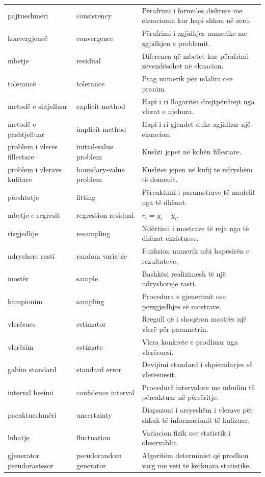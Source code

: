 \documentclass[11pt,oneside,openany]{book}
\begin{document}
\begin{longtable}{p{}p{}p{}}
pajtueshmëri & consistency & Përafrimi i formulës diskrete me ekuacionin kur hapi shkon në zero.\\
konvergjencë & convergence & Përafrimi i zgjidhjes numerike me zgjidhjen e problemit.\\
mbetje & residual & Diferenca që mbetet kur përafrimi zëvendësohet në ekuacion.\\
tolerancë & tolerance & Prag numerik për ndalim ose pranim.\\
metodë e shtjelluar & explicit method & Hapi i ri llogaritet drejtpërdrejt nga vlerat e njohura.\\
metodë e pashtjelluar & implicit method & Hapi i ri gjendet duke zgjidhur një ekuacion.\\
problem i vlerës fillestare & initial-value problem & Kushti jepet në kohën fillestare.\\
problem i vlerave kufitare & boundary-value problem & Kushtet jepen në kufij të ndryshëm të domenit.\\
përshtatje & fitting & Përcaktimi i parametrave të modelit nga të dhënat.\\
mbetje e regresit & regression residual & $r_i=y_i-\hat y_i$.\\
rizgjedhje & resampling & Ndërtimi i mostrave të reja nga të dhënat ekzistuese.\\
ndryshore rasti & random variable & Funksion numerik mbi hapësirën e rezultateve.\\
mostër & sample & Bashkësi realizimesh të një ndryshoreje rasti.\\
kampionim & sampling & Procedura e gjenerimit ose përzgjedhjes së mostrave.\\
vlerësues & estimator & Rregull që i shoqëron mostrës një vlerë për parametrin.\\
vlerësim & estimate & Vlera konkrete e prodhuar nga vlerësuesi.\\
gabim standard & standard error & Devijimi standard i shpërndarjes së vlerësuesit.\\
interval besimi & confidence interval & Procedurë intervalore me mbulim të përcaktuar në përsëritje.\\
pacaktueshmëri & uncertainty & Diapazoni i arsyeshëm i vlerave për shkak të informacionit të kufizuar.\\
luhatje & fluctuation & Variacion fizik ose statistik i observablit.\\
gjenerator pseudorastësor & pseudorandom generator & Algoritëm determinist që prodhon varg me veti të kërkuara statistike.\\

\end{longtable}
\end{document}
